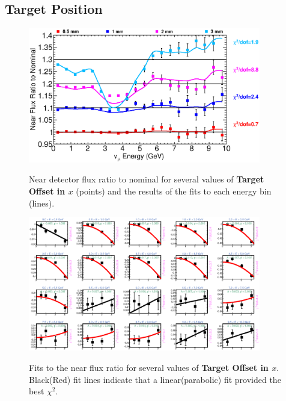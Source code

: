 \subsection{Target Position}

\begin{figure}[ht]
  \begin{center}
    {\includegraphics[width=4.0in]{figures/TargetXOffset_near_summary.eps}}
  \end{center}
\caption{ Near detector flux ratio to nominal for several values of {\bf Target Offset in $x$} (points) and the results of the fits to each energy bin (lines).}
\end{figure}

\begin{figure}[hb]
  \begin{center}
    {\includegraphics[width=4.0in]{figures/TargetXOffset_near_fits.eps}}
  \end{center}
\caption{ Fits to the near flux ratio for several values of {\bf Target Offset in $x$}. Black(Red) fit lines indicate that a linear(parabolic) fit provided the best $\chi^2$. }
\end{figure}

